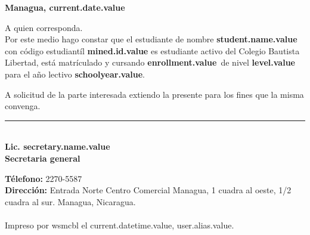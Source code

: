 \documentclass[12pt]{article}
\newcommand{\enrollmentName}{enrollment.value}
\newcommand{\levelName}{level.value}
\newcommand{\minedId}{mined.id.value}
\newcommand{\studentName}{student.name.value}
\newcommand{\schoolYear}{schoolyear.value}
\newcommand{\currentDate}{current.date.value}
\newcommand{\secretaryName}{secretary.name.value}
\newcommand{\userAlias}{user.alias.value}
\newcommand{\currentDatetime}{current.datetime.value}
\begin{document}
    \hfill\textbf{Managua, \currentDate}

    A quien corresponda.\\

    Por este medio hago constar que el estudiante de nombre \textbf{\studentName} con código estudiantíl \textbf{\minedId}
    es estudiante activo del Colegio Bautista Libertad, está matrículado y cursando \textbf{\enrollmentName}~de nivel \textbf{\levelName}
    para el año lectivo \textbf{\schoolYear}.

    A solicitud de la parte interesada extiendo la presente para los fines que la misma convenga.

    \vspace{2cm}
    \begin{center}
        \rule{5cm}{0.4pt}\\[1mm]
        \textbf{Lic. \secretaryName}\\[3mm]
        \textbf{Secretaria general}
    \end{center}
    \vspace{2cm}

    \textbf{Télefono:} 2270-5587\\
    \textbf{Dirección:} Entrada Norte Centro Comercial Managua, 1 cuadra al oeste, 1/2 cuadra al sur. Managua, Nicaragua.\\\\
    {\footnotesize Impreso por wsmcbl el \currentDatetime, \userAlias.}
\end{document}

